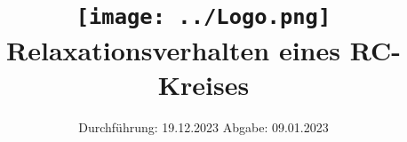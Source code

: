 

\subject{V353}
\title{\texttt{[image: ../Logo.png]}
Relaxationsverhalten eines RC-Kreises}
\date{%
  Durchführung: 19.12.2023
  \hspace{3em}
  Abgabe: 09.01.2023
}




\maketitle
\thispagestyle{empty}
\tableofcontents
\newpage






\printbibliography{}


